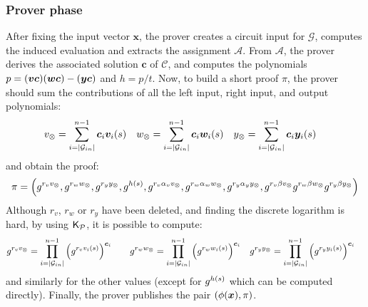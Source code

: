 \subsubsection*{Prover phase}
After fixing the input vector \(\bm{x}\), the prover creates a circuit input for \(\mathcal{G}\), 
computes the induced evaluation and extracts the assignment \(\mathcal{A}\).
From \(\mathcal{A}\), the prover derives the associated solution \(\bm{c}\) of \(\mathcal{C}\),
and computes the polynomials 
\(p = \Parens*{\bm{vc}}\Parens*{\bm{wc}} - \Parens*{\bm{yc}}\) and \(h = p/t\).
Now, to build a short proof \(\pi \), the prover should sum the contributions of all the 
left input, right input, and output polynomials:
\begin{align*}
  & v_{\otimes} = \sum_{i=\abs{\mathcal{G}_{in}}}^{n-1}{\bm{c}_{i}\call{\bm{v}_{i}}{s}} &&
  w_{\otimes} = \sum_{i=\abs{\mathcal{G}_{in}}}^{n-1}{\bm{c}_{i}\call{\bm{w}_{i}}{s}} &&
  y_{\otimes} = \sum_{i=\abs{\mathcal{G}_{in}}}^{n-1}{\bm{c}_{i}\call{\bm{y}_{i}}{s}}
\end{align*}
and obtain the proof:
\[
  \pi = \Tuple{
    g^{r_{v}v_{\otimes}}, 
    g^{r_{w}w_{\otimes}}, 
    g^{r_{y}y_{\otimes}}, 
    g^{\call{h}{s}},
    g^{r_{v}\alpha_{v}v_{\otimes}}, 
    g^{r_{w}\alpha_{w}w_{\otimes}}, 
    g^{r_{y}\alpha_{y}y_{\otimes}}, 
    g^{r_{v}{\beta}v_{\otimes}}g^{r_{w}{\beta}w_{\otimes}}g^{r_{y}{\beta}y_{\otimes}}
    }
\]
Although \(r_v\), \(r_w\) or \(r_y\) have been deleted, and finding the discrete logarithm is hard,
by using \(\ProverKey \), it is possible to compute:
\begin{align}\label{eq:compute_proof}
  & g^{r_{v}v_{\otimes}} = 
  \prod_{i=\abs{\mathcal{G}_{in}}}^{n - 1}{\Parens*{g^{r_{v}\call{v_{i}}{s}}}^{\bm{c}_{i}}} &&
  & g^{r_{w}w_{\otimes}} = 
  \prod_{i=\abs{\mathcal{G}_{in}}}^{n - 1}{\Parens*{g^{r_{w}\call{w_{i}}{s}}}^{\bm{c}_{i}}} &&
  & g^{r_{y}y_{\otimes}} = 
  \prod_{i=\abs{\mathcal{G}_{in}}}^{n - 1}{\Parens*{g^{r_{y}\call{y_{i}}{s}}}^{\bm{c}_{i}}}
\end{align}
and similarly for the other values (except for \(g^{\call{h}{s}}\) which can be computed directly).
Finally, the prover publishes the pair \(\Tuple{\call{\phi}{\bm{x}}, \pi}\).

